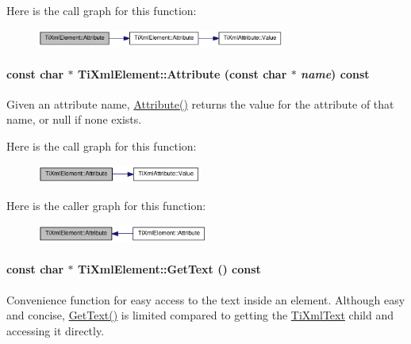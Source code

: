 Here is the call graph for this function:\nopagebreak
\begin{figure}[H]
\begin{center}
\leavevmode
\includegraphics[width=232pt]{class_ti_xml_element_aa9192e80567b5042dbded80b78c44339_cgraph}
\end{center}
\end{figure}
\hypertarget{class_ti_xml_element_ac1e4691e9375ba4e665dce7e46a50a9c}{
\paragraph[{Attribute}]{\setlength{\rightskip}{0pt plus 5cm}const char $\ast$ TiXmlElement::Attribute (const char $\ast$ {\em name}) const}\hfill}
\label{class_ti_xml_element_ac1e4691e9375ba4e665dce7e46a50a9c}
Given an attribute name, \hyperlink{class_ti_xml_element_ac1e4691e9375ba4e665dce7e46a50a9c}{Attribute()} returns the value for the attribute of that name, or null if none exists. 

Here is the call graph for this function:\nopagebreak
\begin{figure}[H]
\begin{center}
\leavevmode
\includegraphics[width=154pt]{class_ti_xml_element_ac1e4691e9375ba4e665dce7e46a50a9c_cgraph}
\end{center}
\end{figure}


Here is the caller graph for this function:\nopagebreak
\begin{figure}[H]
\begin{center}
\leavevmode
\includegraphics[width=160pt]{class_ti_xml_element_ac1e4691e9375ba4e665dce7e46a50a9c_icgraph}
\end{center}
\end{figure}
\hypertarget{class_ti_xml_element_aa6dedd8a146acf3b1bc0903deb2d411a}{
\paragraph[{GetText}]{\setlength{\rightskip}{0pt plus 5cm}const char $\ast$ TiXmlElement::GetText () const}\hfill}
\label{class_ti_xml_element_aa6dedd8a146acf3b1bc0903deb2d411a}
Convenience function for easy access to the text inside an element. Although easy and concise, \hyperlink{class_ti_xml_element_aa6dedd8a146acf3b1bc0903deb2d411a}{GetText()} is limited compared to getting the \hyperlink{class_ti_xml_text}{TiXmlText} child and accessing it directly.

